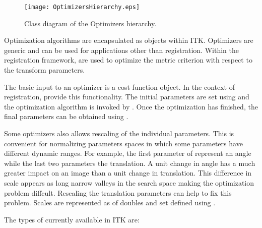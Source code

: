 


\begin{figure}
\center
\texttt{[image: OptimizersHierarchy.eps]}
\caption{Class diagram of the Optimizers hierarchy.}
\label{fig:OptimizersHierarchy}
\end{figure}

Optimization algorithms are encapsulated as  objects
within ITK. Optimizers are generic and can be used for applications other than
registration.  Within the registration framework,
 are used to optimize the metric
criterion with respect to the transform parameters.


The basic input to an optimizer is a cost function object. In the context
of registration,  provide this functionality.
The initial parameters are set using  and
the optimization algorithm is invoked by .
Once the optimization has finished, the final parameters can be obtained
using .

Some optimizers also allows rescaling of the individual parameters. This
is convenient for normalizing parameters spaces in which some parameters
have different dynamic ranges. For example, the first parameter of
 represent an angle while the last two parameters
the translation. A unit change in angle has a much greater impact on
an image than a unit change in translation. This difference in scale appears
as long narrow valleys in the search space making the optimization problem
diffcult. Rescaling the translation parameters can help to fix this problem.
Scales are represented as  of doubles and set defined using
.

The types of  currently available
in ITK are:


